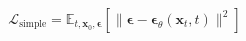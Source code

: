 \documentclass[preview]{standalone}
\begin{document}
\begin{align*}
\mathcal{L}_{\text{simple}} = \mathbb{E}_{t, \mathbf{x}_0, \boldsymbol{\epsilon}} \left[ \| \boldsymbol{\epsilon} - \boldsymbol{\epsilon}_\theta(\mathbf{x}_t, t) \|^2 \right]
\end{align*}
\end{document}
